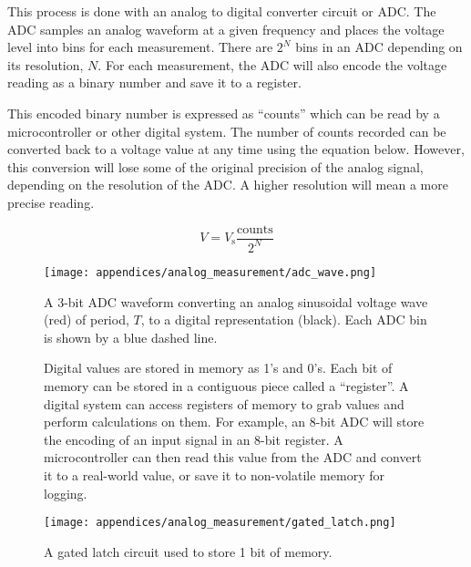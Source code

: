 This process is done with an analog to digital converter circuit or ADC. 
The ADC samples an analog waveform at a given frequency and places the voltage level into bins for each measurement.
There are $2^N$ bins in an ADC depending on its resolution, $N$.
For each measurement, the ADC will also encode the voltage reading as a binary number and save it to a register.

This encoded binary number is expressed as ``counts'' which can be read by a microcontroller or other digital system.
The number of counts recorded can be converted back to a voltage value at any time using the equation below.
However, this conversion will lose some of the original precision of the analog signal, depending on the resolution of the ADC.
A higher resolution will mean a more precise reading.

\begin{equation*}
    V = V_{\text{s}} \frac{\text{counts}}{2^N}
\end{equation*}

\begin{figure}[h!]
    \caption[Analog to digital converter waveform]{A 3-bit ADC waveform converting an analog sinusoidal voltage wave (red) of period, $T$, to a digital representation (black).
    Each ADC bin is shown by a blue dashed line.}
    \centering
    \texttt{[image: appendices/analog\_measurement/adc\_wave.png]}
\end{figure}

\begin{figure}
    \centering
    \begin{fitbox}[frametitle=Aside: Registers]
        Digital values are stored in memory as 1's and 0's.
        Each bit of memory can be stored in a contiguous piece called a ``register''.
        A digital system can access registers of memory to grab values and perform calculations on them.
        For example, an 8-bit ADC will store the encoding of an input signal in an 8-bit register.
        A microcontroller can then read this value from the ADC and convert it to a real-world value, or save it to non-volatile memory for logging.

        \texttt{[image: appendices/analog\_measurement/gated\_latch.png]}
        \caption{A gated latch circuit used to store 1 bit of memory.}
    \end{fitbox}
\end{figure}